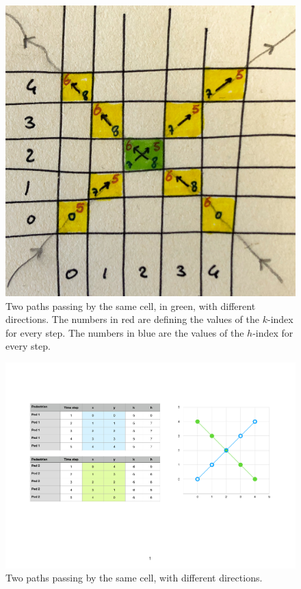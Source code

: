 \documentclass[class=article, crop=false]{standalone}
\begin{document}
\begin{figure}[h]
\centering
\includegraphics[scale=0.1]{draw/eg_distribution_two_trajectories_1}
\captionsetup{width=.7\linewidth}
\caption{Two paths passing by the same cell, in green, with different directions.
The numbers in red are defining the values of the $k$-index for every step.
The numbers in blue are the values of the $h$-index for every step.}
\label{fig:two_trj_same_cell}
\end{figure}
\begin{figure}[h]
\centering
\includegraphics[scale=0.5]{draw/eg_distribution_two_trajectories_2}
\captionsetup{width=.7\linewidth}
\caption{Two paths passing by the same cell, with different directions.}
\label{table:two_trj_same_cell}
\end{figure}
\end{document}
